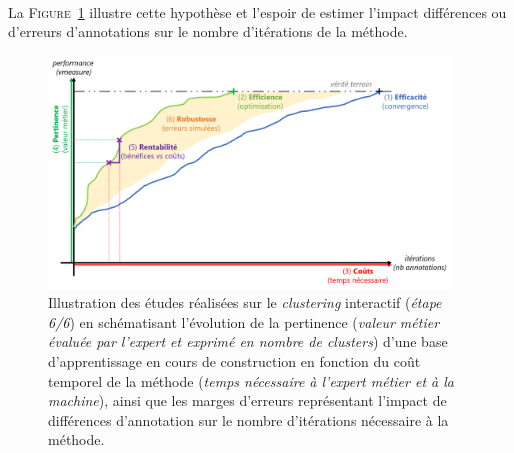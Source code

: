 	\begin{tcolorbox}[
		title=\faVial~\textbf{Hypothèse de robustesse}~\faVial,
		colback=colorTcolorboxHypothesis!15,
		colframe=colorTcolorboxHypothesis!75,
		width=\linewidth
	]
		 \\
		
		La \textsc{Figure~\ref{figure:4.6-HYPOTHESE-ROBUSTESSE}} illustre cette hypothèse et l'espoir de estimer l'impact différences ou d'erreurs d'annotations sur le nombre d'itérations de la méthode.
		\begin{figure}[H]  %
			\centering
			\includegraphics[width=0.95\textwidth]{figures/hypotheses-06-robustesse}
			\caption{
				Illustration des études réalisées sur le \textit{clustering} interactif (\textit{étape 6/6}) en schématisant l'évolution de la pertinence (\textit{valeur métier évaluée par l'expert et exprimé en nombre de clusters}) d'une base d'apprentissage en cours de construction en fonction du coût temporel de la méthode (\textit{temps nécessaire à l'expert métier et à la machine}), ainsi que les marges d'erreurs représentant l'impact de différences d'annotation sur le nombre d'itérations nécessaire à la méthode.
			}
			\label{figure:4.6-HYPOTHESE-ROBUSTESSE}
		\end{figure}
	\end{tcolorbox}
		
